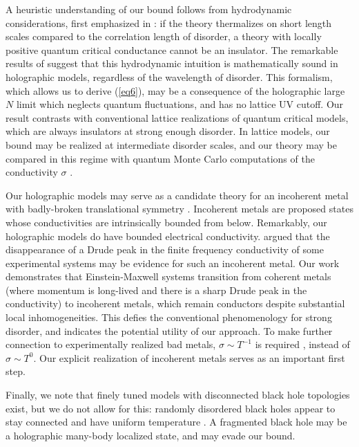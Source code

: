 \documentclass[10pt, oneside]{book}
\begin{document}
\begin{doublespace}
A heuristic understanding of our bound follows from hydrodynamic considerations, first emphasized in \cite{Lucas:2015lna}:  if the theory thermalizes on short length scales compared to the correlation length of disorder, a theory with locally positive quantum critical conductance cannot be an insulator.    The remarkable results of \cite{Donos:2015gia} suggest that this hydrodynamic intuition is mathematically sound in holographic models, regardless of the wavelength of disorder. This formalism, which allows us to derive (\ref{eq6}),  may be a consequence of the holographic large $N$ limit which neglects quantum fluctuations, and has no lattice UV cutoff.  Our result contrasts  with conventional lattice realizations of quantum critical models, which are always insulators at strong enough disorder.  In lattice models, our bound may be realized at intermediate disorder scales, and our theory may be compared in this regime with quantum Monte Carlo computations of the conductivity $\sigma$ \cite{wallin}.



Our holographic models may serve as a candidate theory for an incoherent metal with badly-broken translational symmetry \cite{Hartnoll:2014lpa}.   Incoherent metals are proposed states whose conductivities are intrinsically bounded from below.   Remarkably, our holographic models do have bounded electrical conductivity.    \cite{Hartnoll:2014lpa} argued that the disappearance of a Drude peak in the finite frequency conductivity of some experimental systems may be evidence for such an incoherent metal.    Our work demonstrates that Einstein-Maxwell systems transition from coherent metals (where momentum is long-lived and there is a sharp Drude peak in the conductivity) to incoherent metals,  which remain conductors despite substantial local inhomogeneities.   This defies the conventional phenomenology for strong disorder, and indicates the potential utility of our approach.  To make further connection to experimentally realized bad metals, $\sigma \sim T^{-1}$ is required \cite{kasahara}, instead of $\sigma \sim T^0$.    Our explicit realization of incoherent metals serves as an important first step.

Finally, we note that finely tuned models with disconnected black hole topologies \cite{Anninos:2013mfa, Horowitz:2014gva} exist, but we do not allow for this: randomly disordered black holes appear to stay connected and have uniform temperature \cite{Hartnoll:2014cua, Hartnoll:2015faa}.   A fragmented black hole may be a holographic many-body localized \cite{basko} state, and may evade our bound.


\end{doublespace}
\end{document}
